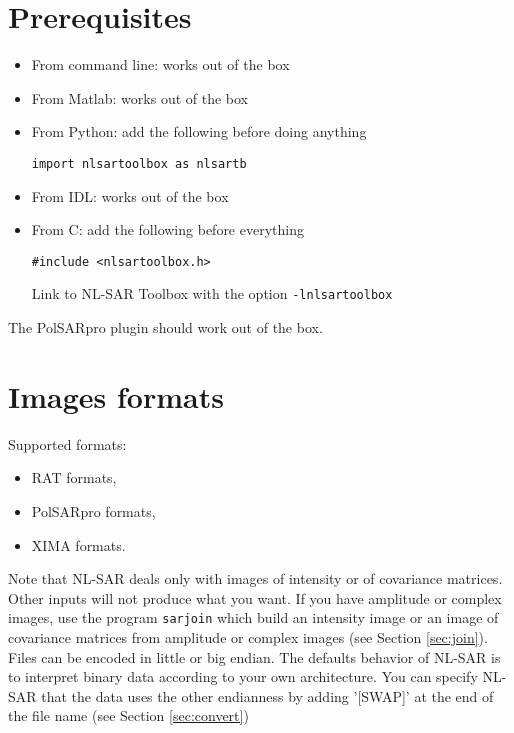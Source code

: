 \documentclass[10pt,french,english,a4paper]{article}
\begin{document}
\section{Prerequisites}

\begin{itemize}
\item From command line: works out of the box
\item From Matlab: works out of the box
\item From Python: add the following before doing anything
\begin{Verbatim}[frame=single]
    import nlsartoolbox as nlsartb
\end{Verbatim}
\item From IDL: works out of the box
\item From C: add the following before everything
  \begin{Verbatim}[frame=single]
    #include <nlsartoolbox.h>
  \end{Verbatim}
  Link to NL-SAR Toolbox with the option \texttt{-lnlsartoolbox}
\end{itemize}

The PolSARpro plugin should work out of the box.

\section{Images formats}

Supported formats:
\begin{itemize}
  \item RAT formats,
  \item PolSARpro formats,
  \item XIMA formats.
\end{itemize}

Note that
NL-SAR deals only with images of intensity or of covariance matrices.
Other inputs will not produce what you want.
If you have amplitude or complex images, use
the program \texttt{sarjoin} which build an intensity image or
an image of covariance matrices from amplitude or complex images
(see Section \ref{sec:join}).\\

Files can be encoded in little or big endian.
The defaults behavior of NL-SAR is to interpret binary data according to your own architecture.
You can specify NL-SAR that the data uses the other endianness by adding '[SWAP]' at the
end of the file name (see Section \ref{sec:convert})
\end{document}
